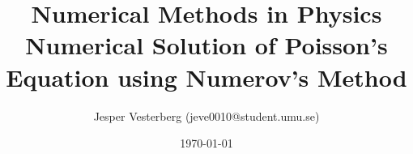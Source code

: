 \title{Numerical Methods in Physics \\ Numerical Solution of Poisson's Equation using Numerov's Method}
\author{Jesper Vesterberg (jeve0010@student.umu.se)}
\date{\today}

\begin{titlepage}
  \maketitle
  \thispagestyle{fancy}
  \rhead{\today}
\end{titlepage}

